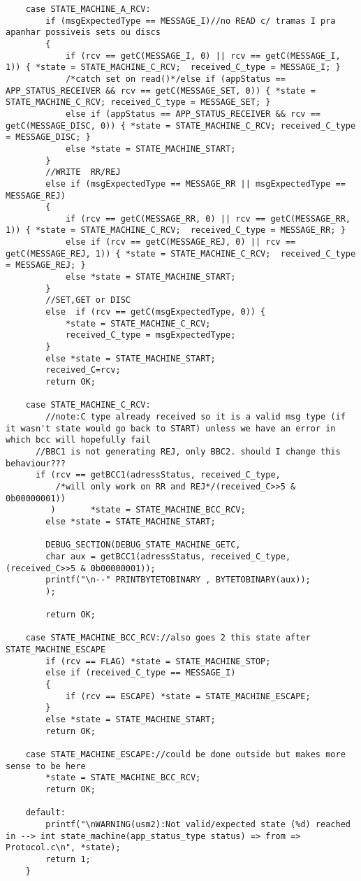 \begin{lstlisting}
	case STATE_MACHINE_A_RCV:
		if (msgExpectedType == MESSAGE_I)//no READ c/ tramas I pra apanhar possiveis sets ou discs
		{
			if (rcv == getC(MESSAGE_I, 0) || rcv == getC(MESSAGE_I, 1)) { *state = STATE_MACHINE_C_RCV;  received_C_type = MESSAGE_I; }
			/*catch set on read()*/else if (appStatus == APP_STATUS_RECEIVER && rcv == getC(MESSAGE_SET, 0)) { *state = STATE_MACHINE_C_RCV; received_C_type = MESSAGE_SET; }
			else if (appStatus == APP_STATUS_RECEIVER && rcv == getC(MESSAGE_DISC, 0)) { *state = STATE_MACHINE_C_RCV; received_C_type = MESSAGE_DISC; }
			else *state = STATE_MACHINE_START;
		}
		//WRITE  RR/REJ
		else if (msgExpectedType == MESSAGE_RR || msgExpectedType == MESSAGE_REJ)
		{
			if (rcv == getC(MESSAGE_RR, 0) || rcv == getC(MESSAGE_RR, 1)) { *state = STATE_MACHINE_C_RCV;  received_C_type = MESSAGE_RR; }
			else if (rcv == getC(MESSAGE_REJ, 0) || rcv == getC(MESSAGE_REJ, 1)) { *state = STATE_MACHINE_C_RCV;  received_C_type = MESSAGE_REJ; }
			else *state = STATE_MACHINE_START;
		}
		//SET,GET or DISC
		else  if (rcv == getC(msgExpectedType, 0)) {
			*state = STATE_MACHINE_C_RCV;
			received_C_type = msgExpectedType;
		}
		else *state = STATE_MACHINE_START;
		received_C=rcv;
		return OK;

	case STATE_MACHINE_C_RCV:
		//note:C type already received so it is a valid msg type (if it wasn't state would go back to START) unless we have an error in which bcc will hopefully fail
	  //BBC1 is not generating REJ, only BBC2. should I change this behaviour???
	  if (rcv == getBCC1(adressStatus, received_C_type,
		  /*will only work on RR and REJ*/(received_C>>5 & 0b00000001)) 
	     )       *state = STATE_MACHINE_BCC_RCV;
		else *state = STATE_MACHINE_START;
		
		DEBUG_SECTION(DEBUG_STATE_MACHINE_GETC,
		char aux = getBCC1(adressStatus, received_C_type,(received_C>>5 & 0b00000001));
		printf("\n--" PRINTBYTETOBINARY , BYTETOBINARY(aux));
		);
		
		return OK;

	case STATE_MACHINE_BCC_RCV://also goes 2 this state after STATE_MACHINE_ESCAPE
		if (rcv == FLAG) *state = STATE_MACHINE_STOP;
		else if (received_C_type == MESSAGE_I)
		{
			if (rcv == ESCAPE) *state = STATE_MACHINE_ESCAPE;
		}
		else *state = STATE_MACHINE_START;
		return OK;

	case STATE_MACHINE_ESCAPE://could be done outside but makes more sense to be here
		*state = STATE_MACHINE_BCC_RCV;
		return OK;

	default:
		printf("\nWARNING(usm2):Not valid/expected state (%d) reached in --> int state_machine(app_status_type status) => from => Protocol.c\n", *state);
		return 1;
	}


\end{lstlisting}
